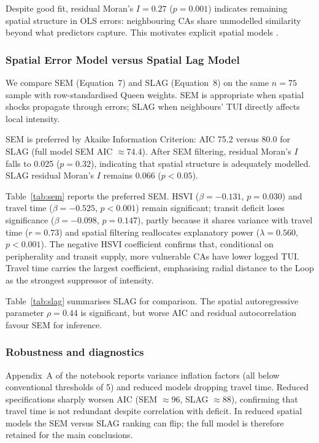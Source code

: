 \documentclass[10pt, a4paper]{article}
\begin{document}
Despite good fit, residual Moran's $I=0.27$ ($p=0.001$) indicates remaining spatial structure in OLS errors: neighbouring CAs share unmodelled similarity beyond what predictors capture. This motivates explicit spatial models \cite{anselin1988}.

\subsubsection{Spatial Error Model versus Spatial Lag Model}
We compare SEM (Equation~7) and SLAG (Equation~8) on the same $n=75$ sample with row-standardised Queen weights. SEM is appropriate when spatial shocks propagate through errors; SLAG when neighbours' TUI directly affects local intensity.

SEM is preferred by Akaike Information Criterion: AIC 75.2 versus 80.0 for SLAG (full model SEM AIC $\approx 74.4$). After SEM filtering, residual Moran's $I$ falls to 0.025 ($p=0.32$), indicating that spatial structure is adequately modelled. SLAG residual Moran's $I$ remains 0.066 ($p<0.05$).

Table~\ref{tab:sem} reports the preferred SEM. HSVI ($\beta=-0.131$, $p=0.030$) and travel time ($\beta=-0.525$, $p<0.001$) remain significant; transit deficit loses significance ($\beta=-0.098$, $p=0.147$), partly because it shares variance with travel time ($r=0.73$) and spatial filtering reallocates explanatory power ($\lambda=0.560$, $p<0.001$). The negative HSVI coefficient confirms that, conditional on peripherality and transit supply, more vulnerable CAs have lower logged TUI. Travel time carries the largest coefficient, emphasising radial distance to the Loop as the strongest suppressor of intensity.

Table~\ref{tab:slag} summarises SLAG for comparison. The spatial autoregressive parameter $\rho=0.44$ is significant, but worse AIC and residual autocorrelation favour SEM for inference.

\subsubsection{Robustness and diagnostics}
Appendix~A of the notebook reports variance inflation factors (all below conventional thresholds of 5) and reduced models dropping travel time. Reduced specifications sharply worsen AIC (SEM $\approx 96$, SLAG $\approx 88$), confirming that travel time is not redundant despite correlation with deficit. In reduced spatial models the SEM versus SLAG ranking can flip; the full model is therefore retained for the main conclusions.
\end{document}
